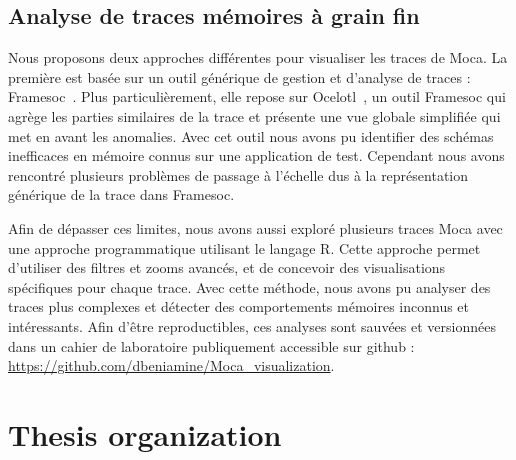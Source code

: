 \subsection*{Analyse de traces mémoires à grain fin}

Nous proposons deux approches différentes pour visualiser les traces de \gls{Moca}.
La première est basée sur un outil générique de gestion et d'analyse de traces : \gls{Framesoc}~\cite{Pagano14frameSoC}.
Plus particulièrement, elle repose sur \gls{Ocelotl}~\cite{Dosimont14Ocelotl}, un outil \gls{Framesoc} qui agrège les parties similaires de la trace et présente une vue globale simplifiée qui met en avant les anomalies.
Avec cet outil nous avons pu identifier des schémas inefficaces en mémoire connus sur une application de test.
Cependant nous avons rencontré plusieurs problèmes de passage à l'échelle dus à la représentation générique de la trace dans \gls{Framesoc}.

Afin de dépasser ces limites, nous avons aussi exploré plusieurs traces \gls{Moca} avec une approche programmatique utilisant le langage \gls{R}.
Cette approche permet d'utiliser des filtres et zooms avancés, et de concevoir des visualisations spécifiques pour chaque trace.
Avec cette méthode, nous avons pu analyser des traces plus complexes et détecter des comportements mémoires inconnus et intéressants.
Afin d'être reproductibles, ces analyses sont sauvées et versionnées dans un cahier de laboratoire publiquement accessible sur github :\\
\url{https://github.com/dbeniamine/Moca_visualization}.

\section*{Thesis organization}

